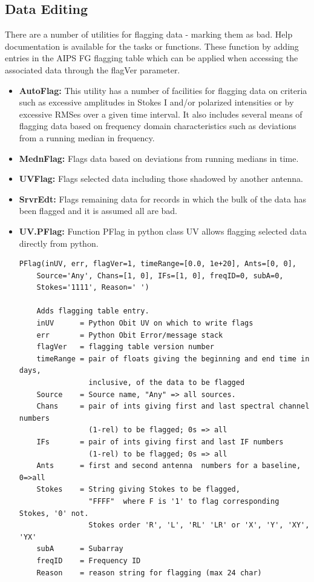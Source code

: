 \documentclass[11pt]{report}
\begin{document}
\subsection{Data Editing}
There are a number of utilities for flagging data - marking them as
bad.
Help documentation is available for the tasks or functions.
These function by adding entries in the AIPS FG flagging
table which can be applied when accessing the associated data through
the flagVer parameter.
\begin{itemize}
\item {\bf AutoFlag:} This utility has a number of facilities for
  flagging data on criteria such as excessive amplitudes in Stokes I
  and/or polarized intensities or by excessive RMSes over a given
  time interval. 
It also includes several means of flagging data based on frequency
domain characteristics such as deviations from a running median in
frequency. 
\item {\bf MednFlag:} Flags data based on deviations from running
  medians in time.
\item {\bf UVFlag:} Flags selected data including those shadowed by
  another antenna.
\item {\bf SrvrEdt:} Flags remaining data for records in which the
  bulk of the data has been flagged and it is assumed all are bad.
\item {\bf UV.PFlag:} Function PFlag in python class UV allows
  flagging selected data directly from python.
\begin{verbatim}
PFlag(inUV, err, flagVer=1, timeRange=[0.0, 1e+20], Ants=[0, 0],
    Source='Any', Chans=[1, 0], IFs=[1, 0], freqID=0, subA=0, 
    Stokes='1111', Reason=' ')
    
    Adds flagging table entry.
    inUV      = Python Obit UV on which to write flags
    err       = Python Obit Error/message stack
    flagVer   = flagging table version number
    timeRange = pair of floats giving the beginning and end time in days,
                inclusive, of the data to be flagged
    Source    = Source name, "Any" => all sources.
    Chans     = pair of ints giving first and last spectral channel numbers
                (1-rel) to be flagged; 0s => all
    IFs       = pair of ints giving first and last IF numbers
                (1-rel) to be flagged; 0s => all
    Ants      = first and second antenna  numbers for a baseline, 0=>all
    Stokes    = String giving Stokes to be flagged, 
                "FFFF"  where F is '1' to flag corresponding Stokes, '0' not.
                Stokes order 'R', 'L', 'RL' 'LR' or 'X', 'Y', 'XY', 'YX'
    subA      = Subarray
    freqID    = Frequency ID
    Reason    = reason string for flagging (max 24 char)
\end{verbatim}
\end{itemize}
\end{document}
